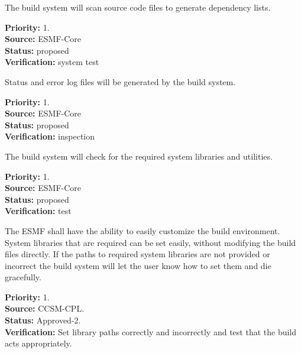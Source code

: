 The build system will scan source code files to 
generate dependency lists.
\begin{reqlist}
{\bf Priority:} 1. \\
{\bf Source:} ESMF-Core \\
{\bf Status:} proposed \\
{\bf Verification:} system test
\end{reqlist}

Status and error log files will be generated by 
the build system.
\begin{reqlist}
{\bf Priority:} 1. \\
{\bf Source:} ESMF-Core \\
{\bf Status:} proposed \\
{\bf Verification:} inspection
\end{reqlist}

The build system will check for the required system 
libraries and utilities.
\begin{reqlist}
{\bf Priority:} 1. \\
{\bf Source:} ESMF-Core \\
{\bf Status:} proposed \\
{\bf Verification:} test
\end{reqlist}

The ESMF shall have the ability to easily customize the build environment. 
System libraries that are required can be set easily, without modifying 
the build files directly. If the paths to required system libraries 
are not provided or incorrect the build system will let the user know 
how to set them and die gracefully.  
\begin{reqlist}
{\bf Priority:} 1. \\
{\bf Source:} CCSM-CPL. \\
{\bf Status:} Approved-2. \\
{\bf Verification:} Set library paths correctly and incorrectly and test that 
the build acts appropriately.
\end{reqlist}
